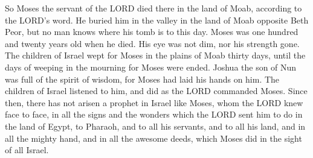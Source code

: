  So Moses the servant of the LORD died there in the land of
Moab, according to the LORD's word.  He buried him in the
valley in the land of Moab opposite Beth Peor, but no man knows where
his tomb is to this day.  Moses was one hundred and twenty
years old when he died. His eye was not dim, nor his strength gone.
 The children of Israel wept for Moses in the plains of Moab
thirty days, until the days of weeping in the mourning for Moses were
ended.  Joshua the son of Nun was full of the spirit of
wisdom, for Moses had laid his hands on him. The children of Israel
listened to him, and did as the LORD commanded Moses. 
Since then, there has not arisen a prophet in Israel like Moses, whom
the LORD knew face to face,  in all the signs and the
wonders which the LORD sent him to do in the land of Egypt, to Pharaoh,
and to all his servants, and to all his land,  and in all
the mighty hand, and in all the awesome deeds, which Moses did in the
sight of all Israel.
